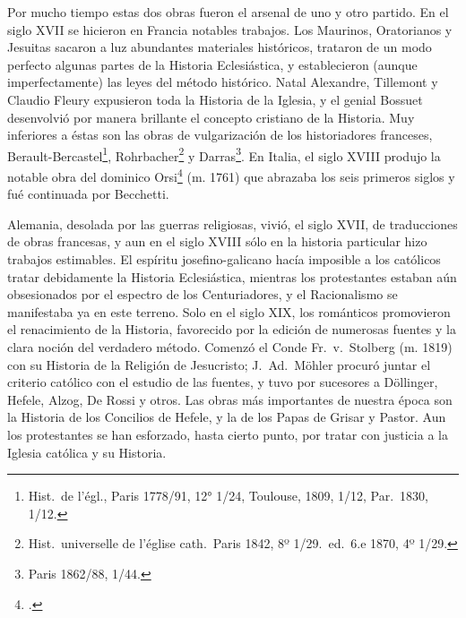 \raggedbottom{} \documentclass[12pt, a4paper, openany]{book} %
\begin{document}
\begin{enumerate}
        Por mucho tiempo estas dos obras fueron el arsenal de uno y otro partido. En el siglo XVII se hicieron en Francia notables trabajos. Los Maurinos, Oratorianos y Jesuitas sacaron a luz abundantes materiales históricos, trataron de un modo perfecto algunas partes de la Historia Eclesiástica, y establecieron (aunque imperfectamente) las leyes del método histórico. Natal Alexandre, Tillemont y Claudio Fleury expusieron toda la Historia de la Iglesia, y el genial Bossuet desenvolvió por manera brillante el concepto cristiano de la Historia. Muy inferiores a éstas son las obras de vulgarización de los historiadores franceses, Berault-Bercastel\footnote{Hist.\ de l'égl., Paris 1778/91, 12° 1/24, Toulouse, 1809, 1/12, Par.\ 1830, 1/12.}, Rohrbacher\footnote{Hist.\ universelle de l'église cath.\ Paris 1842, 8º 1/29.\ ed.\ 6.e 1870, 4º 1/29.} y Darras\footnote{Paris 1862/88, 1/44.}. En Italia, el siglo XVIII produjo la notable obra del dominico Orsi\footcite{OrsiBecchetti1752Storia} (m. 1761) que abrazaba los seis primeros siglos y fué continuada por Becchetti.

        Alemania, desolada por las guerras religiosas, vivió, el siglo XVII, de traducciones de obras francesas, y aun en el siglo XVIII sólo en la historia particular hizo trabajos estimables. El espíritu josefino-galicano hacía imposible a los católicos tratar debidamente la Historia Eclesiástica, mientras los protestantes estaban aún obsesionados por el espectro de los Centuriadores, y el Racionalismo se manifestaba ya en este terreno. Solo en el siglo XIX, los románticos promovieron el renacimiento de la Historia, favorecido por la edición de numerosas fuentes y la clara noción del verdadero método. Comenzó el Conde Fr.\ v.\ Stolberg (m. 1819) con su Historia de la Religión de Jesucristo; J.\ Ad.\ Möhler procuró juntar el criterio católico con el estudio de las fuentes, y tuvo por sucesores a Döllinger, Hefele, Alzog, De Rossi y otros. Las obras más importantes de nuestra época son la Historia de los Concilios de Hefele, y la de los Papas de Grisar y Pastor. Aun los protestantes se han esforzado, hasta cierto punto, por tratar con justicia a la Iglesia católica y su Historia.
\end{enumerate}
\end{document}
